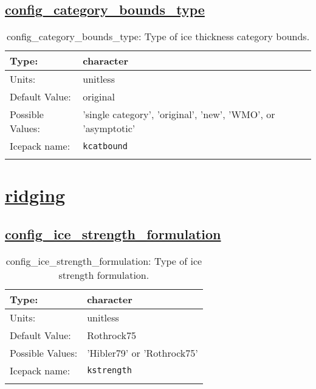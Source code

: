 \subsection[config\_category\_bounds\_type]{\hyperref[sec:nm_tab_itd]{config\_category\_bounds\_type}}
\label{subsec:nm_sec_config_category_bounds_type}
\begin{center}
\begin{longtable}{| p{2.0in} || p{4.0in} |}
    \hline
    Type: & character \\
    \hline
    Units: & \si{unitless} \\
    \hline
    Default Value: & original \\
    \hline
    Possible Values: & 'single category', 'original', 'new', 'WMO', or 'asymptotic' \\
    \hline
    Icepack name: & \verb+kcatbound+ \\
    \hline
    \caption{config\_category\_bounds\_type: Type of ice thickness category bounds.}
\end{longtable}
\end{center}
\section[ridging]{\hyperref[sec:nm_tab_ridging]{ridging}}
\label{sec:nm_sec_ridging}
\subsection[config\_ice\_strength\_formulation]{\hyperref[sec:nm_tab_ridging]{config\_ice\_strength\_formulation}}
\label{subsec:nm_sec_config_ice_strength_formulation}
\begin{center}
\begin{longtable}{| p{2.0in} || p{4.0in} |}
    \hline
    Type: & character \\
    \hline
    Units: & \si{unitless} \\
    \hline
    Default Value: & Rothrock75 \\
    \hline
    Possible Values: & 'Hibler79' or 'Rothrock75' \\
    \hline
    Icepack name: & \verb+kstrength+ \\
    \hline
    \caption{config\_ice\_strength\_formulation: Type of ice strength formulation.}
\end{longtable}
\end{center}
